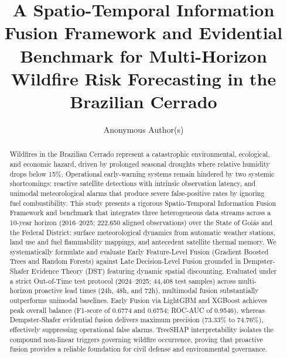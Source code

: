 \documentclass[runningheads]{llncs}
\begin{document}
%
\title{A Spatio-Temporal Information Fusion Framework and Evidential Benchmark for Multi-Horizon Wildfire Risk Forecasting in the Brazilian Cerrado}
%
%
\author{Anonymous Author(s)}
%
\maketitle              %
%
\begin{abstract}
Wildfires in the Brazilian Cerrado represent a catastrophic environmental, ecological, and economic hazard, driven by prolonged seasonal droughts where relative humidity drops below 15\%. Operational early-warning systems remain hindered by two systemic shortcomings: reactive satellite detections with intrinsic observation latency, and unimodal meteorological alarms that produce severe false-positive rates by ignoring fuel combustibility. This study presents a rigorous Spatio-Temporal Information Fusion Framework and benchmark that integrates three heterogeneous data streams across a 10-year horizon (2016--2025; 222,650 aligned observations) over the State of Goi\'as and the Federal District: surface meteorological dynamics from automatic weather stations, land use and fuel flammability mappings, and antecedent satellite thermal memory. We systematically formulate and evaluate Early Feature-Level Fusion (Gradient Boosted Trees and Random Forests) against Late Decision-Level Fusion grounded in Dempster-Shafer Evidence Theory (DST) featuring dynamic spatial discounting. Evaluated under a strict Out-of-Time test protocol (2024--2025; 44,408 test samples) across multi-horizon proactive lead times (24h, 48h, and 72h), multimodal fusion substantially outperforms unimodal baselines. Early Fusion via LightGBM and XGBoost achieves peak overall balance (F1-score of 0.6774 and 0.6754; ROC-AUC of 0.9546), whereas Dempster-Shafer evidential fusion delivers maximum precision (73.33\% to 74.76\%), effectively suppressing operational false alarms. TreeSHAP interpretability isolates the compound non-linear triggers governing wildfire occurrence, proving that proactive fusion provides a reliable foundation for civil defense and environmental governance.

\end{abstract}
\end{document}
